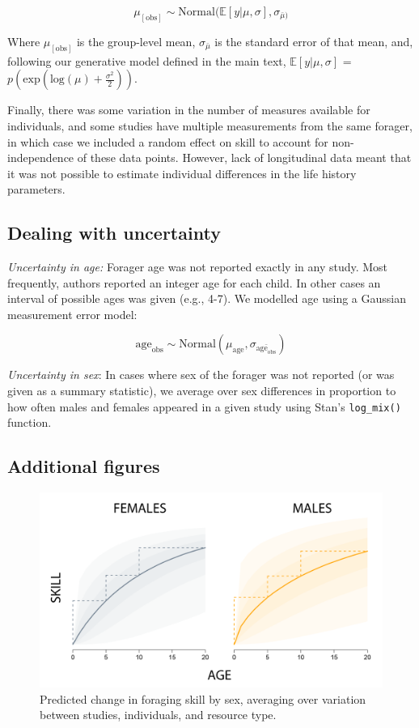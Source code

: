 $$ \mu_{[\textrm{obs}]} \sim \textrm{Normal}(\mathbb{E}[y|\mu,\sigma], \sigma_{\bar{\mu})} $$

Where $\mu_{[\textrm{obs}]}$ is the group-level mean, $\sigma_{\bar{\mu}}$ is the standard error of that mean, and, following our generative model defined in the main text, $\mathbb{E}[y|\mu,\sigma]$ = $p(\textrm{exp}( \textrm{log}(\mu) + \frac{\sigma^2}{2})) $.

Finally, there was some variation in the number of measures available for individuals, and some studies have multiple measurements from the same forager, in which case we included a random effect on skill to account for non-independence of these data points. However, lack of longitudinal data meant that it was not possible to estimate individual differences in the life history parameters.


\subsection{Dealing with uncertainty }

\emph{Uncertainty in age:} Forager age was not reported exactly in any study. Most frequently, authors reported an integer age for each child. In other cases an interval of possible ages was given (e.g., 4-7). We modelled age using a Gaussian measurement error model:

$$ \textrm{age}_{\textrm{obs}} \sim \textrm{Normal}(\mu_{\textrm{age}}, \sigma_{\bar{\textrm{age}_{\textrm{obs}}}}) $$

\emph{Uncertainty in sex}: In cases where sex of the forager was not reported (or was given as a summary statistic), we average over sex differences in proportion to how often males and females appeared in a given study using Stan's \texttt{log\_mix()} function.

\subsection{Additional figures}

\begin{figure}[h]
\centering
\includegraphics[width=12cm] {text/images/sex_diffs.png}
\renewcommand{\thefigure}{S\arabic{figure}}
\setcounter{figure}{0}
\caption{Predicted change in foraging skill by sex, averaging over variation between studies, individuals, and resource type.}
\label{fig:sex_diffs}
\end{figure}


